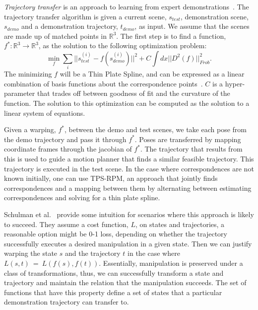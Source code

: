 \emph{Trajectory transfer} is an approach to learning from expert demonstrations~\cite{Schulmanetal_ISRR2013}. The trajectory transfer algorithm is given a current scene, $s_{test}$, demonstration scene, $s_{demo}$ and a demonstration trajectory,  
$t_{demo}$, as input. We assume that the scenes are made up of matched points in $\mathbb{R}^3$. The first step is to 
find a function, $f^*:\mathbb{R}^3 \rightarrow \mathbb{R}^3$, as the solution to the following optimization problem:
\begin{equation}\min_f \sum_i ||s_{test}^{(i)} - f(s_{demo}^{(i)})||^2 + C\int dx ||D^2(f)||^2_{Frob}.\label{eq:tps}\end{equation}
The minimizing $f$ will be a Thin Plate Spline, and can be expressed as a linear combination of basis
functions about the correspondence points~\cite{Wahba_TPS1990}. $C$ is a hyper-parameter that trades off
between goodness of fit and the curvature of the function. The solution to this optimization can be computed
as the solution to a linear system of equations.

Given a warping, $f^*$, between the demo and test scenes, we take each pose from the demo trajectory and pass it through
$f^*$. Poses are transferred by mapping coordinate frames through the jacobian of $f^*$. The trajectory that results from this
is used to guide a motion planner that finds a similar feasible trajectory. This trajectory is executed in the test scene.
In the case where correspondences are not known initially, one can use TPS-RPM, an approach that jointly finds
correspondences and a mapping between them by alternating between estimating correspondences and solving for 
a thin plate spline\cite{Chui_CVIU2003}.

Schulman et al.~\cite{Schulmanetal_ISRR2013} provide some intuition for scenarios where this approach is likely
to succeed. They assume a cost function, $L$, on states and trajectories, a reasonable option might be 0-1 loss, depending
on whether the trajectory successfully executes a desired manipulation in a given state.  Then we can justify warping the
state $s$ and the trajectory $t$ 
in the case where $L(s, t)~=~L(f(s), f(t))$. Essentially, manipulation is preserved under a class of transformations,
thus, we can successfully transform a state and trajectory and maintain the relation that the manipulation succeeds. The set of functions that have this property define a set of states that a particular demonstration trajectory can transfer to.

